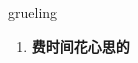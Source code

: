 
\begin{frame}
{\huge grueling}
\begin{center}
\begin{enumerate}\Large
  \item \textbf{费时间花心思的}
\end{enumerate}
\end{center}
\end{frame}
